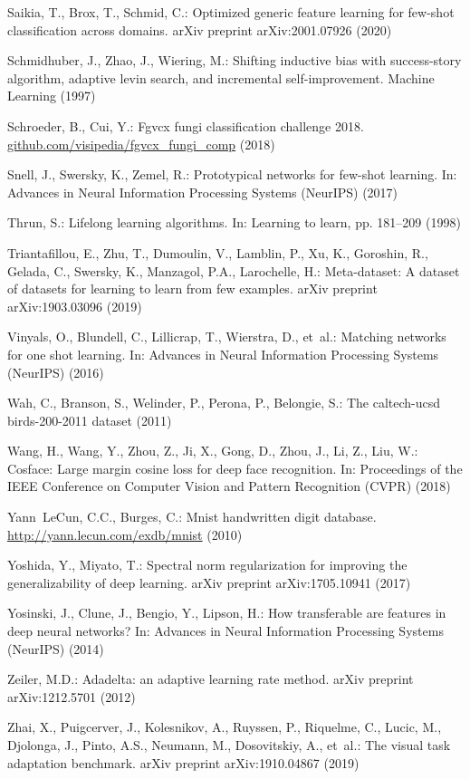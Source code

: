 \documentclass[runningheads]{llncs}
\begin{document}
\begin{thebibliography}{10}
Saikia, T., Brox, T., Schmid, C.: Optimized generic feature learning for
  few-shot classification across domains. arXiv preprint arXiv:2001.07926
  (2020)

Schmidhuber, J., Zhao, J., Wiering, M.: Shifting inductive bias with
  success-story algorithm, adaptive levin search, and incremental
  self-improvement. Machine Learning  (1997)

Schroeder, B., Cui, Y.: Fgvcx fungi classification challenge 2018.
  \url{github.com/visipedia/fgvcx\_fungi\_comp} (2018)

Snell, J., Swersky, K., Zemel, R.: Prototypical networks for few-shot learning.
  In: Advances in Neural Information Processing Systems (NeurIPS) (2017)

Thrun, S.: Lifelong learning algorithms. In: Learning to learn, pp. 181--209
  (1998)

Triantafillou, E., Zhu, T., Dumoulin, V., Lamblin, P., Xu, K., Goroshin, R.,
  Gelada, C., Swersky, K., Manzagol, P.A., Larochelle, H.: Meta-dataset: A
  dataset of datasets for learning to learn from few examples. arXiv preprint
  arXiv:1903.03096  (2019)

Vinyals, O., Blundell, C., Lillicrap, T., Wierstra, D., et~al.: Matching
  networks for one shot learning. In: Advances in Neural Information Processing
  Systems (NeurIPS) (2016)

Wah, C., Branson, S., Welinder, P., Perona, P., Belongie, S.: The caltech-ucsd
  birds-200-2011 dataset  (2011)

Wang, H., Wang, Y., Zhou, Z., Ji, X., Gong, D., Zhou, J., Li, Z., Liu, W.:
  Cosface: Large margin cosine loss for deep face recognition. In: Proceedings
  of the IEEE Conference on Computer Vision and Pattern Recognition (CVPR)
  (2018)

Yann~LeCun, C.C., Burges, C.: Mnist handwritten digit database.
  \url{http://yann.lecun.com/exdb/mnist} (2010)

Yoshida, Y., Miyato, T.: Spectral norm regularization for improving the
  generalizability of deep learning. arXiv preprint arXiv:1705.10941  (2017)

Yosinski, J., Clune, J., Bengio, Y., Lipson, H.: How transferable are features
  in deep neural networks? In: Advances in Neural Information Processing
  Systems (NeurIPS) (2014)

Zeiler, M.D.: Adadelta: an adaptive learning rate method. arXiv preprint
  arXiv:1212.5701  (2012)

Zhai, X., Puigcerver, J., Kolesnikov, A., Ruyssen, P., Riquelme, C., Lucic, M.,
  Djolonga, J., Pinto, A.S., Neumann, M., Dosovitskiy, A., et~al.: The visual
  task adaptation benchmark. arXiv preprint arXiv:1910.04867  (2019)

\end{thebibliography}
 \clearpage
\end{document}
